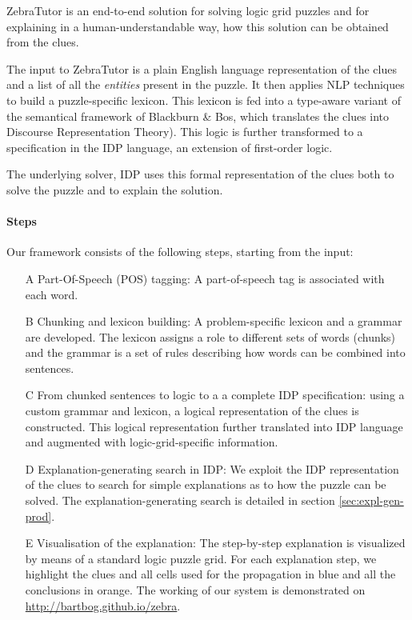 ZebraTutor is an end-to-end solution for solving logic grid puzzles and for explaining in a human-understandable way, how this solution can be obtained from the clues. 

The input to ZebraTutor is a plain English language representation of the clues and a list of all the \textit{entities} present in the puzzle. It then applies NLP techniques to build a puzzle-specific lexicon. This lexicon is fed into a type-aware variant of the semantical framework of Blackburn \& Bos, which translates the clues into Discourse Representation Theory). This logic is further transformed to a specification in the IDP language, an extension of first-order logic. 

The underlying solver, IDP\cite{pip:de2018predicate} uses this formal representation of the clues both to solve the puzzle and to explain the solution. 
 
\paragraph{Steps} Our framework consists of the following steps, starting from the input:
\begin{enumerate}
	\item[A] Part-Of-Speech (POS) tagging: A part-of-speech tag is associated with each word.\\
	\item[B] Chunking and lexicon building: A problem-specific lexicon and a grammar are developed. The lexicon assigns a role to different sets of words (chunks) and the grammar is a set of rules describing how words can be combined into sentences.\\
	\item[C] From chunked sentences to logic to a a complete IDP specification: using a custom grammar and lexicon, a logical representation of the clues is constructed. This logical representation further translated into IDP language and augmented with logic-grid-specific information. \\
	\item[D] Explanation-generating search in IDP: We exploit the IDP representation of the clues to search for simple explanations as to how the puzzle can be solved. The explanation-generating search is detailed in section \ref{sec:expl-gen-prod}.\\
	\item[E] Visualisation of the explanation: The step-by-step explanation is visualized by means of a standard logic puzzle grid. For each explanation step, we highlight the clues and all cells used for the propagation in blue and all the conclusions in orange. The working of our system is demonstrated on \url{http://bartbog.github.io/zebra}.
\end{enumerate}

